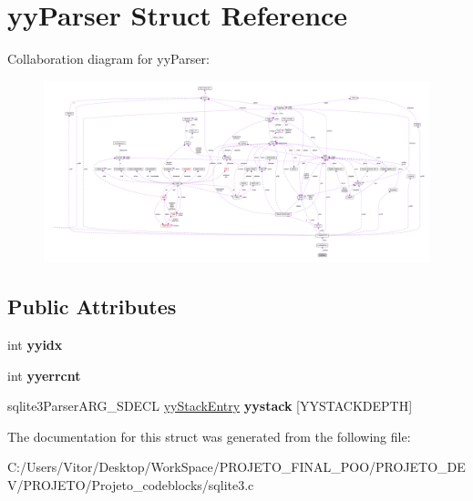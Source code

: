 \hypertarget{structyy_parser}{\section{yy\-Parser Struct Reference}
\label{structyy_parser}
}


Collaboration diagram for yy\-Parser\-:\nopagebreak
\begin{figure}[H]
\begin{center}
\leavevmode
\includegraphics[width=350pt]{structyy_parser__coll__graph}
\end{center}
\end{figure}
\subsection*{Public Attributes}
\begin{DoxyCompactItemize}
\item 
\hypertarget{structyy_parser_a19abcf4780515fd2debd1ce7a2e29f95}{int {\bfseries yyidx}}\label{structyy_parser_a19abcf4780515fd2debd1ce7a2e29f95}

\item 
\hypertarget{structyy_parser_ac0350933aa515a3a756dfa742d04ee59}{int {\bfseries yyerrcnt}}\label{structyy_parser_ac0350933aa515a3a756dfa742d04ee59}

\item 
\hypertarget{structyy_parser_ae8bc1531d6ae56020a7ee33a40783672}{sqlite3\-Parser\-A\-R\-G\-\_\-\-S\-D\-E\-C\-L \hyperlink{structyy_stack_entry}{yy\-Stack\-Entry} {\bfseries yystack} \mbox{[}Y\-Y\-S\-T\-A\-C\-K\-D\-E\-P\-T\-H\mbox{]}}\label{structyy_parser_ae8bc1531d6ae56020a7ee33a40783672}

\end{DoxyCompactItemize}


The documentation for this struct was generated from the following file\-:\begin{DoxyCompactItemize}
\item 
C\-:/\-Users/\-Vitor/\-Desktop/\-Work\-Space/\-P\-R\-O\-J\-E\-T\-O\-\_\-\-F\-I\-N\-A\-L\-\_\-\-P\-O\-O/\-P\-R\-O\-J\-E\-T\-O\-\_\-\-D\-E\-V/\-P\-R\-O\-J\-E\-T\-O/\-Projeto\-\_\-codeblocks/sqlite3.\-c\end{DoxyCompactItemize}
